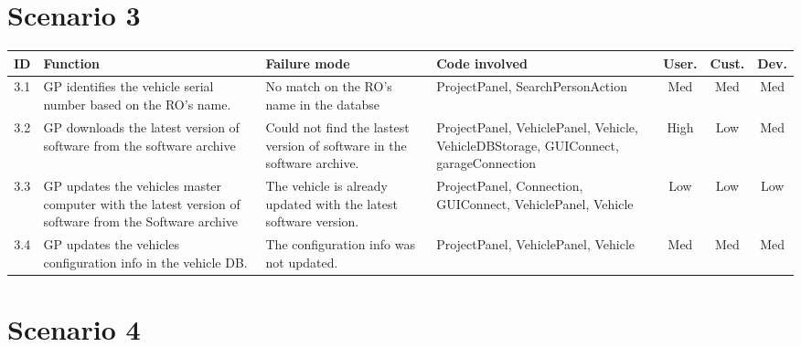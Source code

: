 \begin{landscape}
\begin{longtable}{ c | p{5cm} | p{5cm} | p{5cm} | c | c | c}
		\end{longtable}

	\section{Scenario 3}

		\begin{table}[H]
			\begin{tabular}{ c | p{5cm} | p{5cm} | p{5cm} | c | c | c}
				\hline
				{\bf ID} & {\bf Function} & {\bf Failure mode} & {\bf Code involved} & 
				{\bf User.} & {\bf Cust.} & {\bf Dev.} \\ \hline
				3.1 
				& GP identifies the vehicle serial number
				based on the RO's name.  
				& No match on the RO's name in the databse
				& ProjectPanel, SearchPersonAction 
				& Med & Med & Med \\ \hline
				3.2
				& GP downloads the latest version of software
				from the software archive 
				& Could not find the lastest version of software
				in the software archive.
				& ProjectPanel, VehiclePanel, Vehicle, VehicleDBStorage, GUIConnect, garageConnection
				& High & Low & Med \\ \hline
				3.3 
				& GP updates the vehicles master computer with
				the latest version of software from the Software
				archive 
				& The vehicle is already updated with the latest
				software version.
				& ProjectPanel, Connection, GUIConnect, 
				VehiclePanel, Vehicle
				& Low & Low & Low \\ \hline
				3.4 
				& GP updates the vehicles configuration info 
				in the vehicle DB. 
				& The configuration info was not updated.
				& ProjectPanel, VehiclePanel, 
				Vehicle
				& Med & Med & Med \\ \hline
			\end{tabular}
		\end{table}


	\section{Scenario 4}


\end{landscape}

